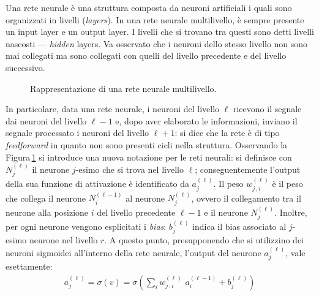 Una rete neurale è una struttura composta da neuroni artificiali i quali sono organizzati in livelli (\textit{layers}). In una rete neurale multilivello, è sempre presente un input layer e un output layer. I livelli che si trovano tra questi sono detti livelli nascosti — \textit{hidden} layers. Va osservato che i neuroni dello stesso livello non sono mai collegati ma sono collegati con quelli del livello precedente e del livello successivo.
% 
\begin{figure}[!b]
    \centering
    
    \caption[Rappresentazione di una rete neurale multilivello.]{Rappresentazione di una rete neurale multilivello.}\label{fig:neural-network}
\end{figure}
% 
In particolare, data una rete neurale, i neuroni del livello $\ell$ ricevono il segnale dai neuroni del livello $\ell-1$ e, dopo aver elaborato le informazioni, inviano il segnale processato i neuroni del livello $\ell+1$: si dice che la rete è di tipo \textit{feedforward} in quanto non sono presenti cicli nella struttura. Osservando la Figura\,\ref{fig:neural-network} si introduce una nuova notazione per le reti neurali: si definisce con $N^{(\ell)}_j$ il neurone $j$-esimo che si trova nel livello $\ell$; conseguentemente l'output della sua funzione di attivazione è identificato da $a^{(\ell)}_j$. Il peso $w^{(\ell)}_{j\,,i}$ è il peso che collega il neurone $N^{(\ell - 1)}_i$ al neurone $N^{(\ell)}_j$, ovvero il collegamento tra il neurone alla posizione $i$ del livello precedente $\ell-1$ e il neurone $N^{(\ell)}_j$. Inoltre, per ogni neurone vengono esplicitati i \textit{bias}: $b^{(\ell)}_j$ indica il bias associato al $j$-esimo neurone nel livello $r$. A questo punto, presupponendo che si utilizzino dei neuroni sigmoidei all'interno della rete neurale, l'output del neurone  $a^{(\ell)}_j$, vale esettamente:
% 
\begin{gather*}
     a^{(\ell)}_j = \sigma\left( v \right) = \sigma\left( \sum_i w^{(\ell)}_{j\,,i} \,\, a^{(\ell - 1)}_i + b^{(\ell)}_j \right)
\end{gather*}


